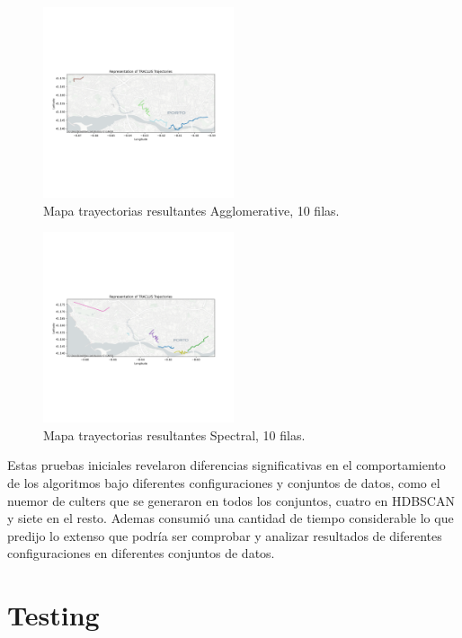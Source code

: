 \begin{itemize}
    \begin{figure}[h!]
    		\centering
    		\includegraphics[width=0.5\textwidth]{img/Taxis/map_aggl_10datos.png}
    		\caption{Mapa trayectorias resultantes Agglomerative, 10 filas.}
    		\label{fig:taxis_10}
	\end{figure}  
	
	\begin{figure}[h!]
    		\centering
    		\includegraphics[width=0.5\textwidth]{img/Taxis/map_spect_10datos.png}
    		\caption{Mapa trayectorias resultantes Spectral, 10 filas.}
    		\label{fig:taxis_10}
	\end{figure}  
\end{itemize}

Estas pruebas iniciales revelaron diferencias significativas en el comportamiento de los algoritmos bajo diferentes configuraciones y conjuntos de datos, como el nuemor de culters que se generaron en todos los conjuntos, cuatro en HDBSCAN y siete en el resto. Ademas consumió una cantidad de tiempo considerable lo que predijo lo extenso que podría ser comprobar y analizar resultados de diferentes configuraciones en diferentes conjuntos de datos.




\section{Testing}

